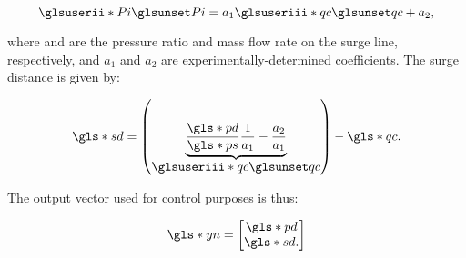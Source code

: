 \begin{equation}
  \gii{Pi} = a_1 \giii{qc} + a_2,
\end{equation}

\noindent where  and  are the pressure ratio and mass flow rate on the surge line, respectively, and $a_1$ and $a_2$ are experimentally-determined coefficients.  
The surge distance is given by:

\begin{equation}
  \g{sd} = \left(\ubrace{\frac{\g{pd}}{\g{ps}}\frac{1}{a_1} - \frac{a_2}{a_1}}{\giii{qc}}\right) - \g{qc}.
\end{equation}

The output vector used for control purposes is thus:

\begin{equation}
  \g{yn} = 
  \begin{bmatrix}
    \g{pd}\\
    \g{sd}.
  \end{bmatrix}
\end{equation}


